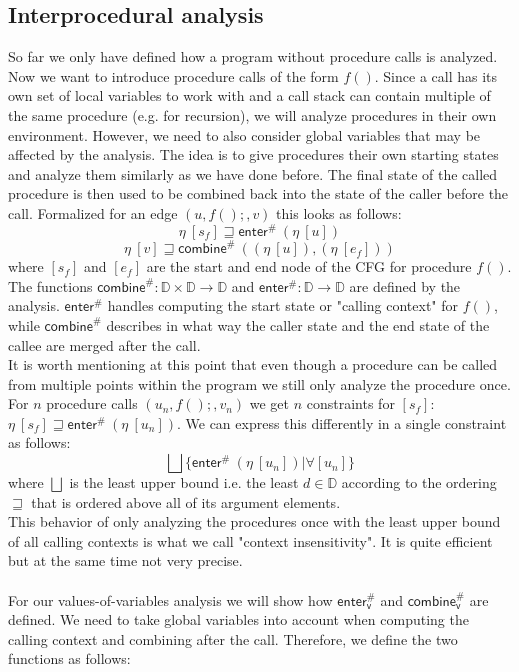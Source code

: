     \subsection{Interprocedural analysis}
    So far we only have defined how a program without procedure calls is analyzed. Now we want to introduce procedure calls of the form $f()$. Since a call has its own set of local variables to work with and a call stack can contain multiple of the same procedure (e.g. for recursion), we will analyze procedures in their own environment. However, we need to also consider global variables that may be affected by the analysis. The idea is to give procedures their own starting states and analyze them similarly as we have done before. The final state of the called procedure is then used to be combined back into the state of the caller before the call. Formalized for an edge $(u, f();, v)$ this looks as follows:
    \[\eta\ [s_f] \sqsupseteq \textsf{enter}^{\#}\ (\eta\ [u]) \]
    \[\eta\ [v] \sqsupseteq  \textsf{combine}^{\#}\ ((\eta\ [u]), (\eta\ [e_f])) \]
    where $[s_f]$ and $[e_f]$ are the start and end node of the CFG for procedure $f()$. The functions $\textsf{combine}^{\#}: \mathbb{D} \times \mathbb{D} \rightarrow \mathbb{D}$ and $\textsf{enter}^{\#}: \mathbb{D} \rightarrow \mathbb{D}$ are defined by the analysis. $\textsf{enter}^{\#}$ handles computing the start state or "calling context" for $f()$, while $\textsf{combine}^{\#}$ describes in what way the caller state and the end state of the callee are merged after the call.\\
    It is worth mentioning at this point that even though a procedure can be called from multiple points within the program we still only analyze the procedure once. For $n$ procedure calls $(u_n, f();, v_n)$ we get $n$ constraints for $[s_f]$: $\eta\ [s_f] \sqsupseteq \textsf{enter}^{\#}\ (\eta\ [u_n])$. We can express this differently in a single constraint as follows:
    \[ \bigsqcup \{ \textsf{enter}^{\#}\ (\eta\ [u_n]) | \forall [u_n] \}\]
    where $\bigsqcup$ is the least upper bound i.e. the least $d \in \mathbb{D}$ according to the ordering $\sqsupseteq$ that is ordered above all of its argument elements.\\
    This behavior of only analyzing the procedures once with the least upper bound of all calling contexts is what we call "context insensitivity". It is quite efficient but at the same time not very precise.\\ 
    \\
    For our values-of-variables analysis we will show how $\textsf{enter}^{\#}_\textsf{v}$ and $\textsf{combine}^{\#}_\textsf{v}$ are defined. We need to take global variables into account when computing the calling context and combining after the call. Therefore, we define the two functions as follows:
